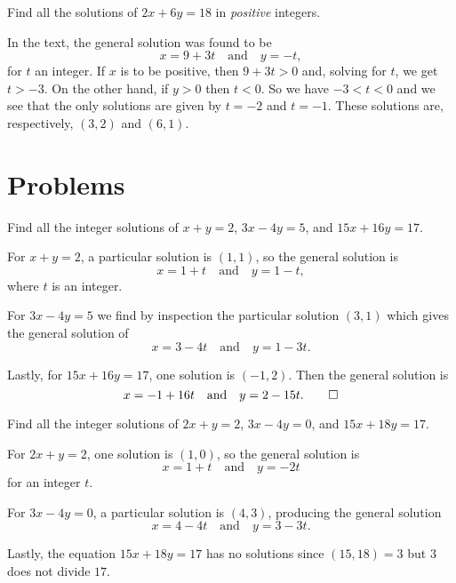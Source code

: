  Find all the solutions of $2x + 6y = 18$ in {\em positive}
integers.
\begin{solution}
  In the text, the general solution was found to be
  \begin{equation*}
    x = 9 + 3t \quad\text{and}\quad y = -t,
  \end{equation*}
  for $t$ an integer. If $x$ is to be positive, then $9 + 3t > 0$ and,
  solving for $t$, we get $t > -3$. On the other hand, if $y > 0$ then
  $t < 0$. So we have $-3 < t < 0$ and we see that the only solutions
  are given by $t = -2$ and $t = -1$. These solutions are,
  respectively, $(3,2)$ and $(6,1)$.
\end{solution}

\section{Problems}

 Find all the integer solutions of $x + y = 2$,
$3x - 4y = 5$, and $15x + 16y = 17$.
\begin{solution}
  For $x + y = 2$, a particular solution is $(1,1)$, so the general
  solution is
  \begin{equation*}
    x = 1 + t \quad\text{and}\quad y = 1 - t,
  \end{equation*}
  where $t$ is an integer.

  For $3x - 4y = 5$ we find by inspection the particular solution
  $(3,1)$ which gives the general solution of
  \begin{equation*}
    x = 3 - 4t \quad\text{and}\quad y = 1 - 3t.
  \end{equation*}

  Lastly, for $15x + 16y = 17$, one solution is $(-1,2)$. Then the
  general solution is
  \begin{equation*}
    x = -1 + 16t
    \quad\text{and}\quad
    y = 2 - 15t. \qedhere
  \end{equation*}
\end{solution}

 Find all the integer solutions of $2x + y = 2$,
$3x - 4y = 0$, and $15x + 18y = 17$.
\begin{solution}
  For $2x + y = 2$, one solution is $(1,0)$, so the general solution
  is
  \begin{equation*}
    x = 1 + t \quad\text{and}\quad y = -2t
  \end{equation*}
  for an integer $t$.

  For $3x - 4y = 0$, a particular solution is $(4,3)$, producing the
  general solution
  \begin{equation*}
    x = 4 - 4t \quad\text{and}\quad y = 3 - 3t.
  \end{equation*}

  Lastly, the equation $15x + 18y = 17$ has no solutions since
  $(15,18) = 3$ but $3$ does not divide $17$.
\end{solution}
